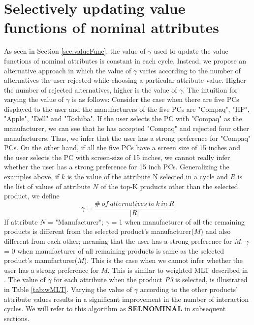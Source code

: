 \section{Selectively updating value functions of nominal attributes}
\label{sec:selNominal}
As seen in Section \ref{sec:valueFunc}, the value of $\gamma$ used to update the value functions of nominal attributes is constant in each cycle.
Instead, we propose an alternative approach in which the value of $\gamma$ varies according to the number of alternatives the user rejected while choosing a particular attribute value. 
Higher the number of rejected alternatives, higher is the value of $\gamma$.
The intuition for varying the value of $\gamma$ is as follows: Consider the case when there are five PCs displayed to the user and the manufacturers of the five PCs are "Compaq", "HP", "Apple", "Dell" and "Toshiba".
If the user selects the PC with "Compaq" as the manufacturer, we can see that he has accepted "Compaq" and rejected four other manufacturers.
Thus, we infer that the user has a strong preference for "Compaq" PCs.
On the other hand, if all the five PCs have a screen size of 15 inches and the user selects the PC with screen-size of 15 inches, we cannot really infer whether the user has a strong preference for 15 inch PCs.
Generalizing the examples above, if $k$ is the value of the attribute N selected in a cycle and $R$ is the list of values of attribute $N$ of the top-K products other than the selected product, we define
%
\begin{equation}
\gamma = \frac{\#\: of\: alternatives\: to\: k\: in\: R}{|R|}
\end{equation}
%
If attribute $N$ = "Manufacturer"; $\gamma$ = 1 when manufacturer of all the remaining products is different from the selected product's manufacturer($M$) and also different from each other; meaning that the user has a strong preference for $M$.
$\gamma$ = 0 when manufacturer of all remaining products is same as the selected product's manufacturer($M$).
This is the case when we cannot infer whether the user has a strong preference for $M$.
This is similar to weighted MLT described in \cite{comparisonbr}.
The value of $\gamma$ for each attribute when the product \textit{P3} is selected, is illustrated in Table \ref{tab:wMLT}.
Varying the value of $\gamma$ according to the other products' attribute values results in a significant improvement in the number of interaction cycles.
We will refer to this algorithm as \textbf{SELNOMINAL} in subsequent sections.



